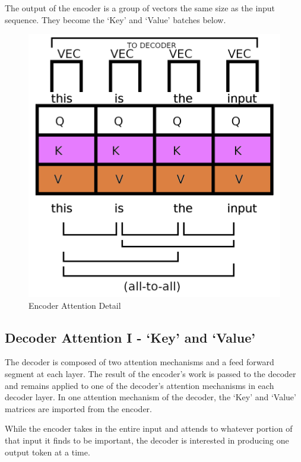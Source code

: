 The output of the encoder is a group of vectors the same size as the input sequence. They become the `Key' and `Value' batches below.


\begin{figure}[H]
	\begin{center}
		
		
		\includegraphics[scale=0.75]{diagram-graph-encoder-flow-a}
	\end{center}
	\caption[Encoder Attention Detail]{Encoder Attention Detail}
	
	
\end{figure}

\subsection{Decoder Attention I - `Key' and `Value'}
The decoder is composed of two attention mechanisms and a feed forward segment at each layer. The result of the encoder's work is passed to the decoder and remains applied to one of the decoder's attention mechanisms in each decoder layer. In one attention mechanism of the decoder, the `Key' and `Value' matrices are imported from the encoder. 

While the encoder takes in the entire input and attends to whatever portion of that input it finds to be important, the decoder is interested in producing one output token at a time. 

